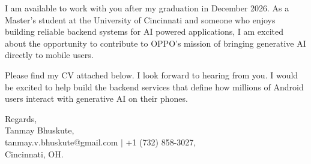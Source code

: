 \documentclass[11pt]{letter}
\begin{document}
\begin{letter}{}
I am available to work with you after my graduation in December 2026. As a Master's student at the University of Cincinnati and someone who enjoys building reliable backend systems for AI powered applications, I am excited about the opportunity to contribute to OPPO's mission of bringing generative AI directly to mobile users.

Please find my CV attached below. I look forward to hearing from you. I would be excited to help build the backend services that define how millions of Android users interact with generative AI on their phones.

{\setlength{\parskip}{0pt}
Regards,\\
Tanmay Bhuskute,\\
tanmay.v.bhuskute@gmail.com $\mid$ +1 (732) 858-3027,\\
Cincinnati, OH.
}

\end{letter}
\end{document}
